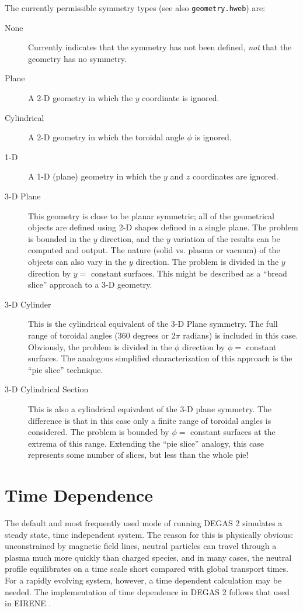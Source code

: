 \documentclass[12pt]{report}
\begin{document}
The currently permissible symmetry types (see 
also {\tt geometry.hweb})
are:
\begin{description}
  \item[None] Currently indicates that the symmetry has not been defined,
{\em not} that the geometry has no symmetry.
  \item[Plane] A 2-D geometry in which the $y$ coordinate is ignored.
  \item[Cylindrical] A 2-D geometry in which the toroidal angle 
$\phi$ is ignored.
  \item[1-D] A 1-D (plane) geometry in which the $y$ and $z$ 
coordinates are ignored.
  \item[3-D Plane] This geometry is close to be planar symmetric;
all of the geometrical objects are defined using 2-D shapes
defined in a single plane. The problem is bounded in the $y$
direction, and the $y$ variation of the results can be 
computed and output. The nature (solid vs. plasma or vacuum)
of the objects can also vary in
the $y$ direction.  The problem is divided in the $y$ direction
by $y = $ constant surfaces.  This might be described as a
``bread slice'' approach to a 3-D geometry.
  \item[3-D Cylinder] This is the cylindrical equivalent of the
3-D Plane symmetry. The full range of toroidal angles (360 degrees
or $2 \pi$ radians) is included in this case. Obviously, the
problem is divided in the $\phi$ direction by $\phi =$ constant
surfaces. The analogous simplified characterization of this approach
is the ``pie slice'' technique.
  \item[3-D Cylindrical Section] This is also a cylindrical equivalent
of the 3-D plane symmetry.  The difference is that in this case
only a finite range of toroidal angles is considered.  The problem
is bounded by $\phi = $ constant surfaces at the extrema of this
range.  Extending the ``pie slice'' analogy, this case represents
some number of slices, but less than the whole pie!
\end{description}

\section{Time Dependence}
\label{TimeDep}

The default and most frequently used mode of running DEGAS 2 simulates a
steady state, time independent system.  The reason for this is physically
obvious: unconstrained by magnetic field lines, neutral particles can
travel through a plasma much more quickly than charged species, and
in many cases, the neutral profile equilibrates on a time scale
short compared with global transport times.
For a rapidly evolving system, however, a
time dependent calculation may be needed. The implementation
of time dependence in DEGAS 2 follows
that used in EIRENE \cite{Reit95}.
\end{document}
